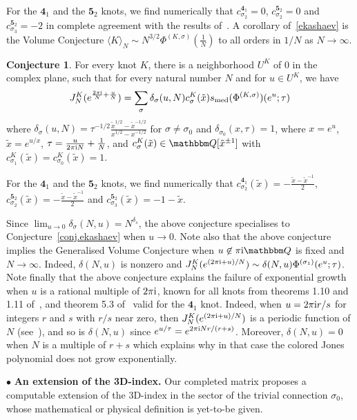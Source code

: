 \documentclass[12pt,reqno]{amsart}
\theoremstyle{definition}
\newtheorem{conjecture}[theorem]{Conjecture}
\def\BQ{\mathbbm Q}
\def\s{\sigma}
\def\tx{\tilde{x}}
\def\ri{\mathrm{i}}
\def\tx{\tilde{x}}
\def\ri{{\rm i}}
\def\md{\mathbf}
\newcommand{\knot}[1]{\md{#1}}
\begin{document}
For the $\knot{4}_1$ and the $\knot{5}_2$ knots,
we find numerically that $c^{\knot{4}_1}_{\s_2}=0$, $c^{\knot{5}_2}_{\s_2}=0$ and
$c^{\knot{5}_2}_{\s_3}=-2$ in complete agreement with the results of~\cite{GZ:kashaev}.
A corollary of~\eqref{ekashaev} is the Volume Conjecture
$\langle K \rangle_N \sim N^{3/2} \Phi^{(K,\s)}(\tfrac{1}{N})$ to all
orders in $1/N$ as $N \to \infty$.

\begin{conjecture}
  \label{conj.ejones}
  For every knot $K$, there is a neighborhood $U^K$ of $0$ in the complex plane, such
  that for every natural number $N$ and for $u \in U^K$, we have 
  \begin{equation}
    \label{ejones}
  J^K_N(e^{\frac{2\pi\ri}{N}+\frac{u}{N}})=  \sum_{\s} \delta_\s(u,N) c^K_\s(\tx)
  s_{\rm med}( \Phi^{(K,\s)})(e^u;\tau)  
\end{equation}
  where $\delta_{\s}(u,N)=\tau^{-1/2} \frac{\tx^{1/2}-\tx^{-1/2}}{x^{1/2}-x^{-1/2}}$
  for $\s \neq \s_0$ and $\delta_{\s_0}(x,\tau)=1$, where $x=e^u$, $\tx=e^{u/x}$,
  $\tau=\tfrac{u}{2\pi\ri N}+\tfrac{1}{N}$, and $c^K_\s(\tx) \in \BQ[\tx^{\pm 1}]$
  with $c^K_{\s_1}(\tx)=c^K_{\s_0}(\tx)=1$. 
\end{conjecture}
For the $\knot{4}_1$ and the $\knot{5}_2$ knots, we find numerically that
$c^{\knot{4}_1}_{\s_2}(\tx)=-\frac{\tx-\tx^{-1}}{2}$,
$c^{\knot{5}_2}_{\s_2}(\tx)=-\frac{\tx-\tx^{-1}}{2}$ and
$c^{\knot{5}_2}_{\s_3}(\tx)=-1-\tx$.

Since $\lim_{u\to 0} \delta_\s(N,u)=N^{\delta_s}$, the above conjecture specialises 
to Conjecture~\ref{conj.ekashaev} when $u \to 0$. Note also that the above conjecture 
implies the  Generalised Volume Conjecture when $u \not\in \pi \ri \BQ$ is fixed and 
$N \to \infty$. Indeed, $\delta(N,u)$ is nonzero and $J^{K}_N(e^{(2\pi\ri +u)/N}) 
\sim \delta(N,u)\Phi^{(\s_1)}(e^u;\tau)$. Note finally that the above conjecture 
explains the failure of exponential growth when $u$ is a rational multiple of $2\pi\ri$, 
known for all knots from theorems 1.10 and 1.11 of~\cite{GL:asy},
and theorem 5.3 of~\cite{Murakami2011:ivc} valid for the $\knot{4}_1$ knot.
Indeed, when $u=2\pi\ri r/s$ for integers $r$ and $s$ with $r/s$ near zero,
then $J^{K}_N(e^{(2\pi\ri +u)/N})$ is a periodic function of $N$ (see~\cite{Ha}), 
and so is $\delta(N,u)$ since $e^{u/\tau}=e^{2\pi\ri N r/(r+s)}$.
Moreover, $\delta(N,u)=0$ when $N$ is a multiple of $r+s$ which explains why in that
case the colored Jones polynomial does not grow exponentially.

\noindent $\bullet$ {\bf An extension of the 3D-index.}
Our completed matrix proposes a computable extension of the
  3D-index in the sector of the trivial connection $\s_0$, whose
  mathematical or physical definition is yet-to-be given.
\end{document}
